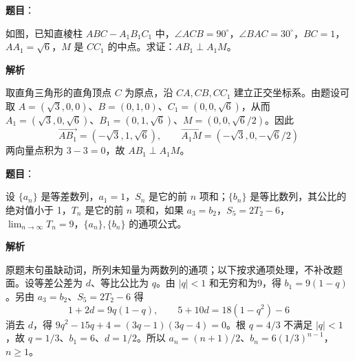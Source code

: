 \begin{answer}

\textbf{题目}：

如图，已知直棱柱 $ABC-A_1B_1C_1$ 中，$\angle ACB=90^\circ$，$\angle BAC=30^\circ$，$BC=1$，$AA_1=\sqrt6$，$M$ 是 $CC_1$ 的中点。求证：$AB_1\perp A_1M$。
\nopagebreak[4]
\begin{center}\end{center}
\nopagebreak[4]
\textbf{解析}

取直角三角形的直角顶点 $C$ 为原点，沿 $CA,CB,CC_1$ 建立正交坐标系。由题设可取 $A=(\sqrt3,0,0)$、$B=(0,1,0)$、$C_1=(0,0,\sqrt6)$，从而 $A_1=(\sqrt3,0,\sqrt6)$、$B_1=(0,1,\sqrt6)$、$M=(0,0,\sqrt6/2)$。因此
\nopagebreak[4]
\[
\overrightarrow{AB_1}=(-\sqrt3,1,\sqrt6),\qquad
\overrightarrow{A_1M}=(-\sqrt3,0,-\sqrt6/2)
\]
两向量点积为 $3-3=0$，故 $AB_1\perp A_1M$。


\end{answer}
\begin{answer}

\textbf{题目}：

设 $\{a_n\}$ 是等差数列，$a_1=1$，$S_n$ 是它的前 $n$ 项和；$\{b_n\}$ 是等比数列，其公比的绝对值小于 1，$T_n$ 是它的前 $n$ 项和，如果 $a_3=b_2$，$S_5=2T_2-6$，$\displaystyle\lim_{n\to\infty}T_n=9$，$\{a_n\},\{b_n\}$ 的通项公式。

\textbf{解析}

原题末句虽缺动词，所列未知量为两数列的通项；以下按求通项处理，不补改题面。设等差公差为 $d$、等比公比为 $q$。由 $|q|<1$ 和无穷和为9，得 $b_1=9(1-q)$。另由 $a_3=b_2$、$S_5=2T_2-6$ 得
\nopagebreak[4]
\[
1+2d=9q(1-q),\qquad 5+10d=18(1-q^2)-6
\]
消去 $d$，得 $9q^2-15q+4=(3q-1)(3q-4)=0$。根 $q=4/3$ 不满足 $|q|<1$，故 $q=1/3$、$b_1=6$、$d=1/2$。所以 $a_n=(n+1)/2$、$b_n=6(1/3)^{n-1}$，$n\ge1$。


\end{answer}
